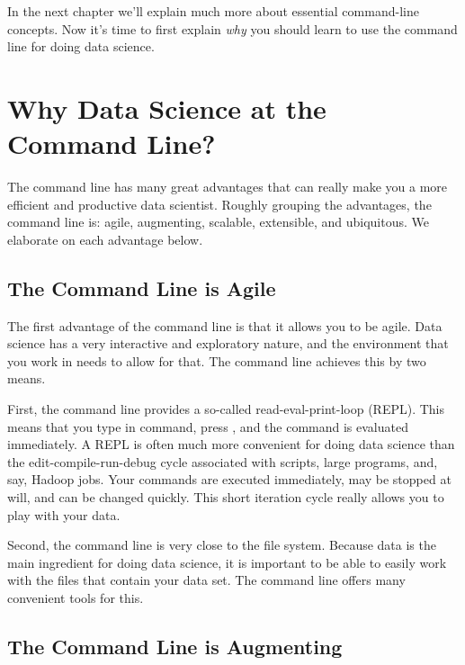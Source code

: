 \documentclass[
]{book}
\theoremstyle{definition}
\theoremstyle{definition}
\theoremstyle{definition}
\theoremstyle{remark}
\begin{document}
In the next chapter we'll explain much more about essential command-line concepts. Now it's time to first explain \emph{why} you should learn to use the command line for doing data science.

\hypertarget{why-data-science-at-the-command-line}{%
\section{Why Data Science at the Command Line?}\label{why-data-science-at-the-command-line}}

The command line has many great advantages that can really make you a more efficient and productive data scientist. Roughly grouping the advantages, the command line is: agile, augmenting, scalable, extensible, and ubiquitous. We elaborate on each advantage below.

\hypertarget{the-command-line-is-agile}{%
\subsection{The Command Line is Agile}\label{the-command-line-is-agile}}

The first advantage of the command line is that it allows you to be agile. Data science has a very interactive and exploratory nature, and the environment that you work in needs to allow for that. The command line achieves this by two means.

First, the command line provides a so-called read-eval-print-loop (REPL). This means that you type in command, press \textbf{}, and the command is evaluated immediately. A REPL is often much more convenient for doing data science than the edit-compile-run-debug cycle associated with scripts, large programs, and, say, Hadoop jobs. Your commands are executed immediately, may be stopped at will, and can be changed quickly. This short iteration cycle really allows you to play with your data.

Second, the command line is very close to the file system. Because data is the main ingredient for doing data science, it is important to be able to easily work with the files that contain your data set. The command line offers many convenient tools for this.

\hypertarget{the-command-line-is-augmenting}{%
\subsection{The Command Line is Augmenting}\label{the-command-line-is-augmenting}}
\end{document}
